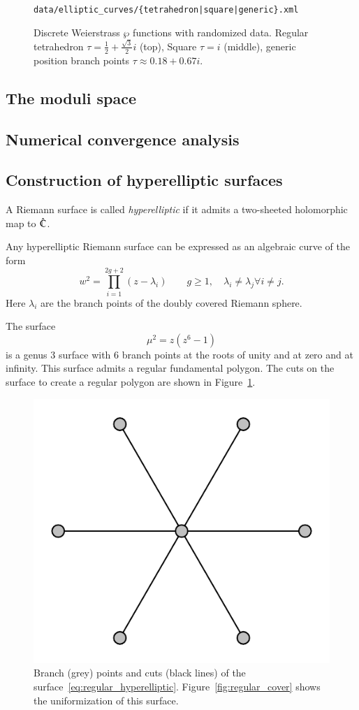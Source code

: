 \documentclass[Thesis.tex]{subfiles}
\begin{document}
\begin{figure}[p] 
\centering
{}
{\scriptsize\tt data/elliptic\_curves/\{tetrahedron|square|generic\}.xml}
\caption{Discrete Weierstrass $\wp$ functions with randomized data. Regular
tetrahedron $\tau=\frac{1}{2}+\frac{\sqrt 3}{2}i$ (top), Square $\tau=i$
(middle), generic position branch points $\tau \approx 0.18+0.67i$.}
\end{figure}

\subsection{The moduli space}
\subsection{Numerical convergence analysis}

\subsection{Construction of hyperelliptic surfaces}
\label{sec:examples_hyperelliptic}

\begin{definition}
A Riemann surface is called \emph{hyperelliptic} if it admits a two-sheeted
holomorphic map to $\hat{\mathbb C}$.  
\end{definition}

Any hyperelliptic Riemann surface can be expressed as an algebraic curve of
the form \[ w^2 = \prod_{i=1}^{2g+2}(z-\lambda_i) \quad\quad g\geq1,\quad
\lambda_i\neq \lambda_j \forall i\neq j.\] Here $\lambda_i$ are the branch
points of the doubly covered Riemann sphere.

\begin{example} 
The surface 
\begin{equation} 
\label{eq:regular_hyperelliptic}
\mu^2=z(z^6-1) 
\end{equation} is a genus $3$ surface with $6$ branch points at
the roots of unity and at zero and at infinity. This surface admits a regular
fundamental polygon.  The cuts on the surface to create a regular polygon are
shown in Figure~\ref{fig:regular_branchdata}.  
\end{example}

\begin{figure}
\centering
\includegraphics[width=0.2\linewidth]{data/hyperelliptic_g3/curve}
\caption{Branch (grey) points and cuts (black lines) of the surface~\ref{eq:regular_hyperelliptic}.
Figure~\ref{fig:regular_cover} shows the uniformization of this surface.}
\label{fig:regular_branchdata}
\end{figure}
\end{document}

